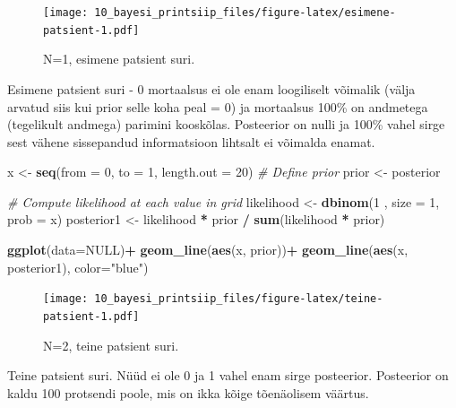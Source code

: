\documentclass[]{book}
\newenvironment{Shaded}{\begin{snugshade}}{\end{snugshade}}
\newcommand{\CommentTok}[1]{\textcolor[rgb]{0.56,0.35,0.01}{\textit{#1}}}
\newcommand{\DataTypeTok}[1]{\textcolor[rgb]{0.13,0.29,0.53}{#1}}
\newcommand{\DecValTok}[1]{\textcolor[rgb]{0.00,0.00,0.81}{#1}}
\newcommand{\KeywordTok}[1]{\textcolor[rgb]{0.13,0.29,0.53}{\textbf{#1}}}
\newcommand{\NormalTok}[1]{#1}
\newcommand{\OperatorTok}[1]{\textcolor[rgb]{0.81,0.36,0.00}{\textbf{#1}}}
\newcommand{\OtherTok}[1]{\textcolor[rgb]{0.56,0.35,0.01}{#1}}
\newcommand{\StringTok}[1]{\textcolor[rgb]{0.31,0.60,0.02}{#1}}
\begin{document}
\begin{figure}
\centering
\texttt{[image: 10\_bayesi\_printsiip\_files/figure-latex/esimene-patsient-1.pdf]}
\caption{\label{fig:esimene-patsient}N=1, esimene patsient suri.}
\end{figure}

Esimene patsient suri - 0 mortaalsus ei ole enam loogiliselt võimalik (välja arvatud siis kui prior selle koha peal = 0) ja mortaalsus 100\% on andmetega (tegelikult andmega) parimini kooskõlas. Posteerior on nulli ja 100\% vahel sirge sest vähene sissepandud informatsioon lihtsalt ei võimalda enamat.



\begin{Shaded}
\begin{Highlighting}[]
\NormalTok{x <-}\StringTok{ }\KeywordTok{seq}\NormalTok{(}\DataTypeTok{from =} \DecValTok{0}\NormalTok{, }\DataTypeTok{to =} \DecValTok{1}\NormalTok{, }\DataTypeTok{length.out =} \DecValTok{20}\NormalTok{)}
\CommentTok{# Define prior}
\NormalTok{prior <-}\StringTok{ }\NormalTok{posterior}

\CommentTok{# Compute likelihood at each value in grid}
\NormalTok{likelihood <-}\StringTok{ }\KeywordTok{dbinom}\NormalTok{(}\DecValTok{1}\NormalTok{ , }\DataTypeTok{size =} \DecValTok{1}\NormalTok{, }\DataTypeTok{prob =}\NormalTok{ x)}
\NormalTok{posterior1 <-}\StringTok{ }\NormalTok{likelihood }\OperatorTok{*}\StringTok{ }\NormalTok{prior }\OperatorTok{/}\StringTok{ }\KeywordTok{sum}\NormalTok{(likelihood }\OperatorTok{*}\StringTok{ }\NormalTok{prior)}

\KeywordTok{ggplot}\NormalTok{(}\DataTypeTok{data=}\OtherTok{NULL}\NormalTok{)}\OperatorTok{+}
\StringTok{  }\KeywordTok{geom_line}\NormalTok{(}\KeywordTok{aes}\NormalTok{(x, prior))}\OperatorTok{+}
\StringTok{  }\KeywordTok{geom_line}\NormalTok{(}\KeywordTok{aes}\NormalTok{(x, posterior1), }\DataTypeTok{color=}\StringTok{"blue"}\NormalTok{)}
\end{Highlighting}
\end{Shaded}

\begin{figure}
\centering
\texttt{[image: 10\_bayesi\_printsiip\_files/figure-latex/teine-patsient-1.pdf]}
\caption{\label{fig:teine-patsient}N=2, teine patsient suri.}
\end{figure}

Teine patsient suri.
Nüüd ei ole 0 ja 1 vahel enam sirge posteerior.
Posteerior on kaldu 100 protsendi poole, mis on ikka kõige tõenäolisem väärtus.
\end{document}
